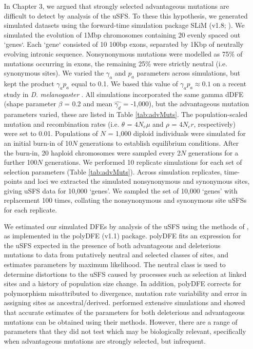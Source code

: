 \documentclass[11pt]{article}
\begin{document}
	In Chapter 3, we argued that strongly selected advantageous mutations are difficult to detect by analysis of the uSFS. To these this hypothesis, we generated simulated datasets using the forward-time simulation package SLiM (v1.8; \citealt{RN148}). We simulated the evolution of 1Mbp chromosomes containing 20 evenly spaced out `genes`. Each `gene` consisted of 10 100bp exons, separated by 1Kbp of neutrally evolving intronic sequence. Nonsynonymous mutations were modelled as 75\% of mutations occurring in exons, the remaining 25\% were strictly neutral (i.e. synonymous sites). We varied the $\gamma_a$ and $p_a$ parameters across simulations, but kept the product $\gamma_a p_a$ equal to 0.1. We based this value of $\gamma_a p_a \approx 0.1$ on a recent study in \textit{D. melanogaster} \citep{RN321}. All simulations incorporated the same gamma dDFE (shape parameter $\beta$ = 0.2 and mean $\hat{\gamma_d}$ = -1,000), but the advantageous mutation parameters varied, these are listed in Table \ref{tab:advMuts}. The population-scaled mutation and recombination rates (i.e. $\theta$ = \emph{$4N_{e}\mu$} and $\rho$ = \emph{$4N_{e}r$}, respectively) were set to 0.01. Populations of $N$ = 1,000 diploid individuals were simulated for an initial burn-in of 10$N$ generations to establish equilibrium conditions. After the burn-in, 20 haploid chromosomes were sampled every 2$N$ generations for a further 100$N$ generations. We performed 10 replicate simulations for each set of selection parameters (Table \ref{tab:advMuts}). Across simulation replicates, time-points and loci we extracted the simulated nonsynonymous and synonymous sites, giving uSFS data for 10,000 `genes'. We sampled the set of 10,000 `genes' with replacement 100 times, collating the nonsynonymous and synonymous site uSFSs for each replicate.
	
	We estimated our simulated DFEs by analysis of the uSFS using the methods of \cite{RN354}, as implemented in the polyDFE (v1.1) package. polyDFE fits an expression for the uSFS expected in the presence of both advantageous and deleterious mutations to data from putatively neutral and selected classes of sites, and estimates parameters by maximum likelihood. The neutral class is used to determine distortions to the uSFS caused by processes such as selection at linked sites and a history of population size change. In addition, polyDFE corrects for polymorphism misattributed to divergence, mutation rate variability and error in assigning sites as ancestral/derived. \cite{RN354} performed extensive simulations and showed that accurate estimates of the parameters for both deleterious and advantageous mutations can be obtained using their methods. However, there are a range of parameters that they did not test which may be biologically relevant, specifically when advantageous mutations are strongly selected, but infrequent.
\end{document}
